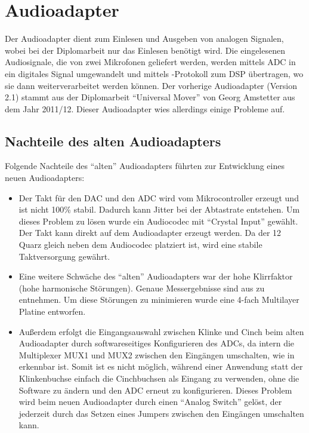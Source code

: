 \section{Audioadapter \cite{da:sps}}
\label{sec:audioadapter}

Der Audioadapter dient zum Einlesen und Ausgeben von analogen Signalen, wobei bei der Diplomarbeit nur das Einlesen benötigt wird. Die eingelesenen Audiosignale, die von zwei Mikrofonen geliefert werden, werden mittels \gls{ADC} in ein digitales Signal umgewandelt und mittels \IIS{}-Protokoll zum \gls{DSP} übertragen, wo sie dann weiterverarbeitet werden können. Der vorherige Audioadapter (Version 2.1) stammt aus der Diplomarbeit \enquote{Universal Mover} von Georg Amstetter \cite{da:umover} aus dem Jahr 2011/12. Dieser Audioadapter wies allerdings einige Probleme auf.

\subsection{Nachteile des alten Audioadapters}
Folgende Nachteile des \enquote{alten} Audioadapters führten zur Entwicklung eines neuen Audioadapters:
\begin{itemize}
    \item Der Takt für den \gls{DAC} und den \gls{ADC} wird vom Mikrocontroller erzeugt und ist nicht 100\% stabil. Dadurch kann Jitter bei der Abtastrate entstehen. Um dieses Problem zu lösen wurde ein Audiocodec mit \enquote{Crystal Input} gewählt. Der Takt kann direkt auf dem Audioadapter erzeugt werden. Da der \unit{12}{\mega\hertz} Quarz gleich neben dem Audiocodec platziert ist, wird eine stabile Taktversorgung gewährt.
    \item Eine weitere Schwäche des \enquote{alten} Audioadapters war der hohe Klirrfaktor (hohe harmonische Störungen). Genaue Messergebnisse sind aus  zu entnehmen. Um diese Störungen zu minimieren wurde eine 4-fach Multilayer Platine entworfen.
    \item Außerdem erfolgt die Eingangsauswahl zwischen Klinke und Cinch beim alten Audioadapter durch softwareseitiges Konfigurieren des \gls{ADC}s, da intern die Multiplexer MUX1 und MUX2 zwischen den Eingängen umschalten, wie in  erkennbar ist. Somit ist es nicht möglich, während einer Anwendung statt der Klinkenbuchse einfach die Cinchbuchsen als Eingang zu verwenden, ohne die Software zu ändern und den \gls{ADC} erneut zu konfigurieren. Dieses Problem wird beim neuen Audioadapter durch einen \enquote{Analog Switch} gelöst, der jederzeit durch das Setzen eines Jumpers zwischen den Eingängen umschalten kann.
\end{itemize}


